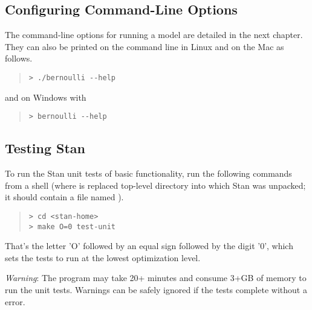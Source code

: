 \subsection{Configuring Command-Line Options}

The command-line options for running a model are detailed in
the next chapter. They can also be printed on the command
line in Linux and on the Mac as follows.
%
\begin{quote}
\begin{Verbatim}[fontshape=sl]
> ./bernoulli --help
\end{Verbatim}
\end{quote}
%
and on Windows with
%
\begin{quote}
\begin{Verbatim}[fontshape=sl]
> bernoulli --help
\end{Verbatim}
\end{quote}

\subsection{Testing Stan}

To run the Stan unit tests of basic functionality, run the
following commands from a shell (where  is replaced
top-level directory into which Stan was unpacked; it should contain a
file named ).
%
\begin{quote}
\begin{Verbatim}[fontshape=sl]
> cd <stan-home>
> make O=0 test-unit
\end{Verbatim}
\end{quote}
%
That's the letter 'O' followed by an equal sign followed by the digit
'0', which sets the tests to run at the lowest optimization level.

\emph{Warning}: The  program may take 20+ minutes 
and consume 3+GB of memory to run the unit tests.  Warnings can
be safely ignored if the tests complete without a  error.





